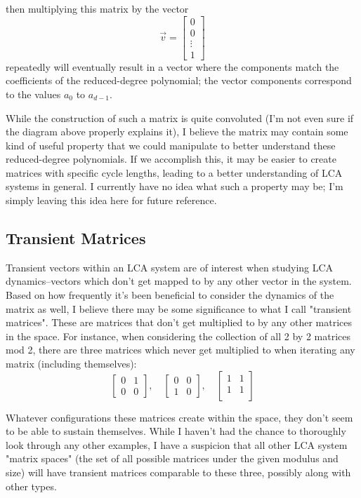 \documentclass[a4paper, 12pt, reqno]{amsart}
\newcommand{\ssubsection}[1]{\vspace{0.25cm}\subsection{#1}}
\begin{document}
			then multiplying this matrix by the vector 
			\[
				\vec{v} = 
				\begin{bmatrix}
					0      \\
					0      \\
					\vdots \\
					1
				\end{bmatrix}
			\]
			repeatedly will eventually result in a vector where the components match the coefficients of the reduced-degree
			polynomial; the vector components correspond to the values $a_0$ to $a_{d-1}$.
			
			While the construction of such a matrix is quite convoluted (I'm not even sure if the diagram above properly
			explains it), I believe the matrix may contain some kind of useful property that we could manipulate to better
			understand these reduced-degree polynomials. If we accomplish this, it may be easier to create matrices with
			specific cycle lengths, leading to a better understanding of LCA systems in general. I currently have no idea
			what such a property may be; I'm simply leaving this idea here for future reference.
		
		\ssubsection{Transient Matrices}
			Transient vectors within an LCA system are of interest when studying LCA dynamics--vectors which don't get mapped
			to by any other vector in the system. Based on how frequently it's been beneficial to consider the dynamics of 
			the matrix as well, I believe there may be some significance to what I call "transient matrices". These are matrices
			that don't get multiplied to by any other matrices in the space. For instance, when considering the collection of
			all 2 by 2 matrices mod 2, there are three matrices which never get multiplied to when iterating any matrix 
			(including themselves):
			\[
				\begin{bmatrix}
					0 & 1 \\
					0 & 0
				\end{bmatrix}, \quad
				\begin{bmatrix}
					0 & 0 \\
					1 & 0
				\end{bmatrix}, \quad
				\begin{bmatrix}
					1 & 1 \\
					1 & 1 \\
				\end{bmatrix}
			\]
			
			Whatever configurations these matrices create within the space, they don't seem to be able to sustain themselves.
			While I haven't had the chance to thoroughly look through any other examples, I have a suspicion that all other
			LCA system "matrix spaces" (the set of all possible matrices under the given modulus and size) will have transient
			matrices comparable to these three, possibly along with other types.
			
\end{document}
